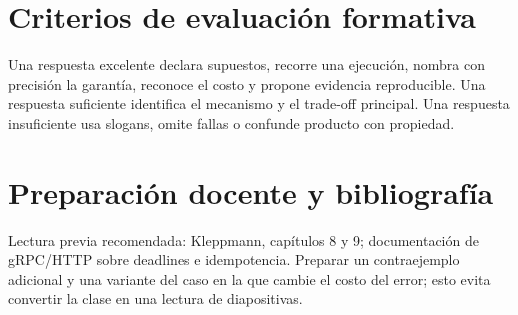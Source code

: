 \documentclass[variant=docente,cover=institutional,mode=screen]{ua-engineering-v6-article}
\begin{document}
\section{Criterios de evaluación formativa}
Una respuesta excelente declara supuestos, recorre una ejecución, nombra con precisión la garantía, reconoce el costo y propone evidencia reproducible. Una respuesta suficiente identifica el mecanismo y el trade-off principal. Una respuesta insuficiente usa slogans, omite fallas o confunde producto con propiedad.

\section{Preparación docente y bibliografía}
Lectura previa recomendada: Kleppmann, capítulos 8 y 9; documentación de gRPC/HTTP sobre deadlines e idempotencia. Preparar un contraejemplo adicional y una variante del caso en la que cambie el costo del error; esto evita convertir la clase en una lectura de diapositivas.
\end{document}
